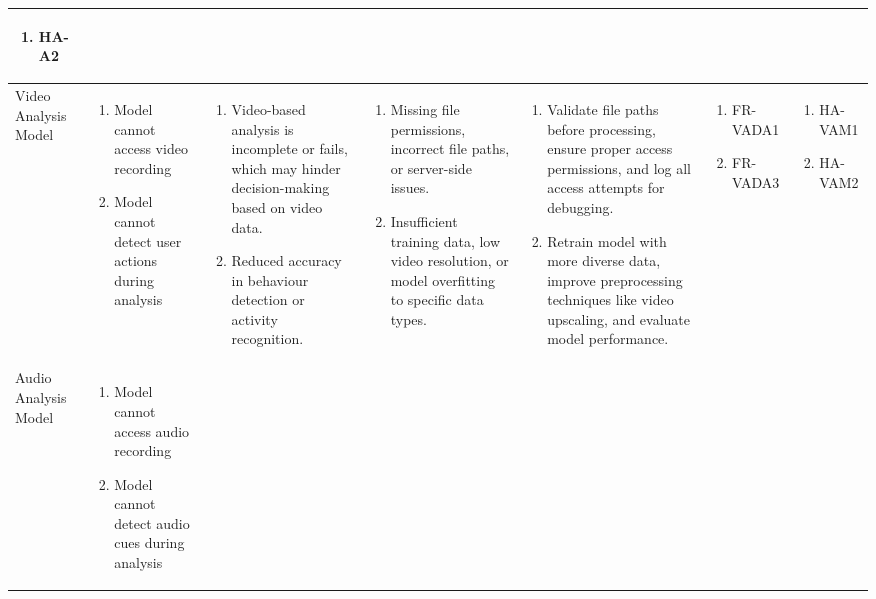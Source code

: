 \documentclass{article}
\begin{document}
\begin{landscape}
\begin{longtable}{|p{3cm}|p{3cm}|p{4cm}|p{4cm}|p{3cm}|p{2cm}|p{3cm}|}
\begin{enumerate}[leftmargin=*]
       \item HA-A2
  \end{enumerate} \\
  \hline
  Video Analysis Model & 
  \begin{enumerate}[leftmargin=*]
      \item Model cannot access video recording
      \item Model cannot detect user actions during analysis
  \end{enumerate} & 
  \begin{enumerate}[leftmargin=*]
      \item Video-based analysis is incomplete or fails, which may hinder decision-making based on video data.
      \item Reduced accuracy in behaviour detection or activity recognition.
  \end{enumerate} &
  \begin{enumerate}[leftmargin=*]
       \item Missing file permissions, incorrect file paths, or server-side issues.
       \item Insufficient training data, low video resolution, or model overfitting to specific data types.
  \end{enumerate} &
  \begin{enumerate}[leftmargin=*]
       \item Validate file paths before processing, ensure proper access permissions, and log all access attempts for debugging.
       \item Retrain model with more diverse data, improve preprocessing techniques like video upscaling, and evaluate model performance.
  \end{enumerate} &
  \begin{enumerate}[leftmargin=*]
       \item FR-VADA1
       \item FR-VADA3
  \end{enumerate} &
  \begin{enumerate}[leftmargin=*]
       \item HA-VAM1
       \item HA-VAM2
  \end{enumerate} \\
  \hline
  Audio Analysis Model & 
  \begin{enumerate}[leftmargin=*]
      \item Model cannot access audio recording
      \item Model cannot detect audio cues during analysis

\end{enumerate}
\end{longtable}
\end{landscape}
\end{document}
